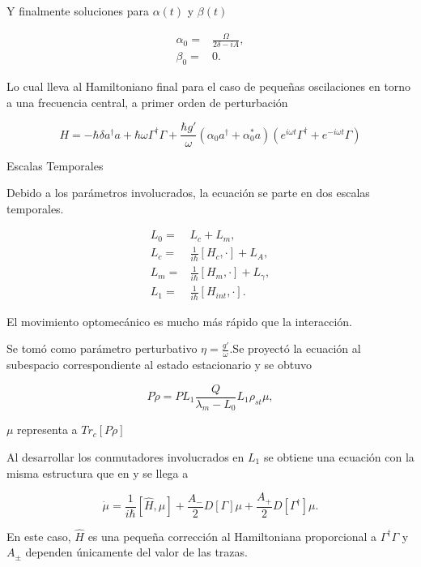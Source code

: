 \documentclass[11pt]{beamer}
\begin{document}
\begin{frame}
Y finalmente soluciones para $\alpha(t)$ y $\beta(t)$

\begin{align}
\alpha_0 =& \frac{\Omega}{2\delta-iA},\\
\beta_0 =& 0.
\end{align}

Lo cual lleva al Hamiltoniano final para el caso de pequeñas oscilaciones en torno a una frecuencia central, a primer orden de perturbación

\begin{equation}
H = -\hbar \delta a^{\dagger}a +\hbar\omega\Gamma^{\dagger}\Gamma +\frac{\hbar g'}{\omega}(\alpha_0 a^{\dagger}+\alpha^*_0 a)(e^{i\omega t}\Gamma^{\dagger}+e^{-i\omega t}\Gamma)
\end{equation}
\end{frame}

\begin{frame}{Escalas Temporales}

Debido a los parámetros involucrados, la ecuación se parte en dos escalas temporales. 

\begin{align*}
L_0 =& L_c + L_m,\\
L_c =& \frac{1}{i\hbar}[H_c,\cdot] + L_A,\\
L_m =& \frac{1}{i\hbar}[H_m,\cdot] + L_\gamma,\\
L_1 =& \frac{1}{i\hbar}[H_{int},\cdot].
\end{align*}

El movimiento optomecánico es mucho más rápido que la interacción.


\end{frame}

\begin{frame}
 Se tomó como parámetro perturbativo $\eta=\frac{g'}{\omega}$.Se proyectó la ecuación al subespacio correspondiente al estado estacionario y se obtuvo

\begin{equation}
P\dot{\rho} = PL_1 \frac{Q}{\lambda_m-L_0}L_1\rho_{st}\mu,
\end{equation}

$\mu$ representa a $Tr_c[P\rho]$
\end{frame}

\begin{frame}

Al desarrollar los conmutadores involucrados en $L_1$ se obtiene una ecuación con la misma estructura que en \cite{BarberisLC} y se llega a

\begin{equation}
\dot{\mu} = \frac{1}{i\hbar}[\hat{H},\mu] + \frac{A_-}{2}D[\Gamma]\mu + \frac{A_+}{2}D[\Gamma^\dagger]\mu.
\end{equation}

En este caso, $\hat{H}$ es una pequeña corrección al Hamiltoniana proporcional a $\Gamma^\dagger \Gamma$ y $A_\pm$ dependen únicamente del valor de las trazas.

\end{frame}
\end{document}
